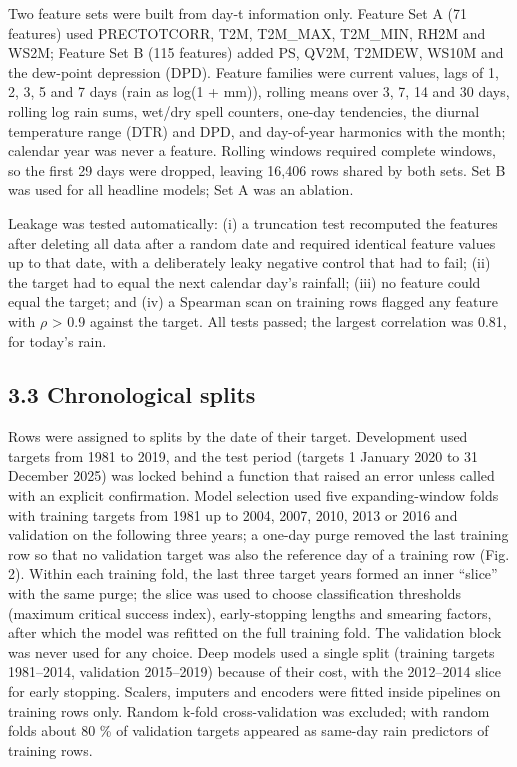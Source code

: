 \documentclass[
]{article}
\begin{document}
Two feature sets were built from day-t information only. Feature Set A (71 features) used PRECTOTCORR, T2M, T2M\_MAX, T2M\_MIN, RH2M and WS2M; Feature Set B (115 features) added PS, QV2M, T2MDEW, WS10M and the dew-point depression (DPD).  %
Feature families were current values, lags of 1, 2, 3, 5 and 7 days (rain as log(1 + mm)), rolling means over 3, 7, 14 and 30 days, rolling log rain sums, wet/dry spell counters, one-day tendencies, the diurnal temperature range (DTR) and DPD, and day-of-year harmonics with the month; calendar year was never a feature. Rolling windows required complete windows, so the first 29 days were dropped, leaving 16,406 rows shared by both sets.  %
Set B was used for all headline models; Set A was an ablation.

Leakage was tested automatically: (i) a truncation test recomputed the features after deleting all data after a random date and required identical feature values up to that date, with a deliberately leaky negative control that had to fail; (ii) the target had to equal the next calendar day's rainfall; (iii) no feature could equal the target; and (iv) a Spearman scan on training rows flagged any feature with \textbar $\rho$\textbar{} \textgreater{} 0.9 against the target. All tests passed; the largest correlation was 0.81, for today's rain.  %

\hypertarget{chronological-splits}{%
\subsection{3.3 Chronological splits}\label{chronological-splits}}

Rows were assigned to splits by the date of their target. Development used targets from 1981 to 2019, and the test period (targets 1 January 2020 to 31 December 2025) was locked behind a function that raised an error unless called with an explicit confirmation. Model selection used five expanding-window folds with training targets from 1981 up to 2004, 2007, 2010, 2013 or 2016 and validation on the following three years; a one-day purge removed the last training row so that no validation target was also the reference day of a training row (Fig. 2). Within each training fold, the last three target years formed an inner ``slice'' with the same purge; the slice was used to choose classification thresholds (maximum critical success index), early-stopping lengths and smearing factors, after which the model was refitted on the full training fold. The validation block was never used for any choice. Deep models used a single split (training targets 1981--2014, validation 2015--2019) because of their cost, with the 2012--2014 slice for early stopping. Scalers, imputers and encoders were fitted inside pipelines on training rows only. Random k-fold cross-validation was excluded; with random folds about 80 \% of validation targets appeared as same-day rain predictors of training rows.
\end{document}
